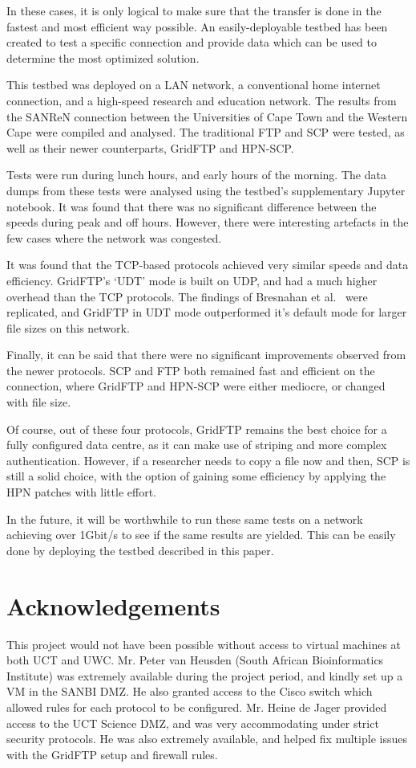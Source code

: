\documentclass{sig-alternate-05-2015}
\begin{document}
In these cases, it is only logical to make sure that the transfer is done in the fastest and most efficient way possible. An easily-deployable testbed has been created to test a specific connection and provide data which can be used to determine the most optimized solution.

This testbed was deployed on a LAN network, a conventional home internet connection, and a high-speed research and education network. The results from the SANReN connection between the Universities of Cape Town and the Western Cape were compiled and analysed. The traditional FTP and SCP were tested, as well as their newer counterparts, GridFTP and HPN-SCP.

Tests were run during lunch hours, and early hours of the morning. The data dumps from these tests were analysed using the testbed's supplementary Jupyter notebook. It was found that there was no significant difference between the speeds during peak and off hours. However, there were interesting artefacts in the few cases where the network was congested.

It was found that the TCP-based protocols achieved very similar speeds and data efficiency. GridFTP's `UDT' mode is built on UDP, and had a much higher overhead than the TCP protocols. The findings of Bresnahan et al.~\cite{bresnahan2009udt} were replicated, and GridFTP in UDT mode outperformed it's default mode for larger file sizes on this network.

Finally, it can be said that there were no significant improvements observed from the newer protocols. SCP and FTP both remained fast and efficient on the connection, where GridFTP and HPN-SCP were either mediocre, or changed with file size.

Of course, out of these four protocols, GridFTP remains the best choice for a fully configured data centre, as it can make use of striping and more complex authentication. However, if a researcher needs to copy a file now and then, SCP is still a solid choice, with the option of gaining some efficiency by applying the HPN patches with little effort.

In the future, it will be worthwhile to run these same tests on a network achieving over 1Gbit/s to see if the same results are yielded. This can be easily done by deploying the testbed described in this paper.

\section{Acknowledgements}
This project would not have been possible without access to virtual machines at both UCT and UWC. Mr. Peter van Heusden (South African Bioinformatics Institute) was extremely available during the project period, and kindly set up a VM in the SANBI DMZ. He also granted access to the Cisco switch which allowed rules for each protocol to be configured. Mr. Heine de Jager provided access to the UCT Science DMZ, and was very accommodating under strict security protocols. He was also extremely available, and helped fix multiple issues with the GridFTP setup and firewall rules.
\end{document}

